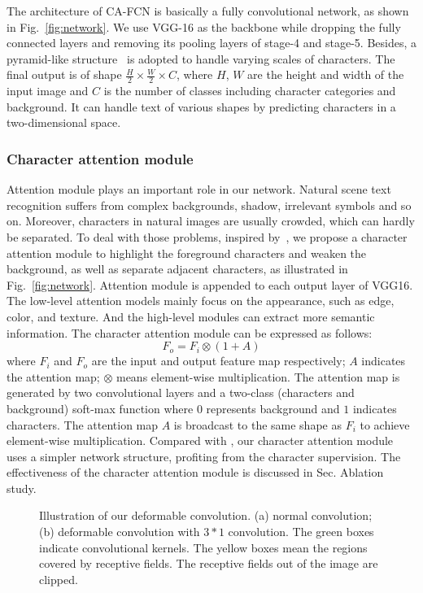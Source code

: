 \documentclass[letterpaper]{article} \usepackage{aaai19}  \usepackage{times}  \usepackage{helvet}  \usepackage{courier}  \usepackage{url}  \usepackage{graphicx}  \frenchspacing  \usepackage{multirow}
\begin{document}
The architecture of CA-FCN is basically a fully convolutional network, as shown in Fig.~\ref{fig:network}. We use VGG-16 as the backbone while dropping the fully connected layers and removing its pooling layers of stage-4 and stage-5. Besides, a pyramid-like structure~\cite{fpn} is adopted to handle varying scales of characters. The final output is of shape $\frac{H}{2} \times \frac{W}{2} \times C$, where $H$, $W$ are the height and width of the input image and $C$ is the number of classes including character categories and background. It can handle text of various shapes by predicting characters in a two-dimensional space.

\subsubsection{Character attention module}
Attention module plays an important role in our network. Natural scene text recognition suffers from complex backgrounds, shadow, irrelevant symbols and so on. Moreover, characters in natural images are usually crowded, which can hardly be separated. To deal with those problems, inspired by~\cite{res-attention}, we propose a character attention module to highlight the foreground characters and weaken the background, as well as separate adjacent characters, as illustrated in Fig.~\ref{fig:network}. Attention module is appended to each output layer of VGG16. The low-level attention models mainly focus on the appearance, such as edge, color, and texture. And the high-level modules can extract more semantic information. The character attention module can be expressed as follows:
\begin{equation}
F_o = F_i \otimes (1+A)
\end{equation}
where $F_i$ and $F_o$ are the input and output feature map respectively; $A$ indicates the attention map; $\otimes$ means element-wise multiplication. The attention map is generated by two convolutional layers and a two-class (characters and background) soft-max function where $0$ represents background and $1$ indicates characters. The attention map $A$ is broadcast to the same shape as $F_i$ to achieve element-wise multiplication. 
Compared with \cite{res-attention}, our character attention module uses a simpler network structure, profiting from the character supervision.
The effectiveness of the character attention module is discussed in Sec. Ablation study.

\begin{figure}[!htp]
\begin{center}
\captionsetup[subfigure]{justification=centering}
    \centering
{}
\end{center}
\caption{Illustration of our deformable convolution. (a) normal convolution; (b) deformable convolution with $3*1$ convolution. The green boxes indicate convolutional kernels. The yellow boxes mean the regions covered by receptive fields. The receptive fields out of the image are clipped.}
\label{fig:deform}
\end{figure}
\end{document}
